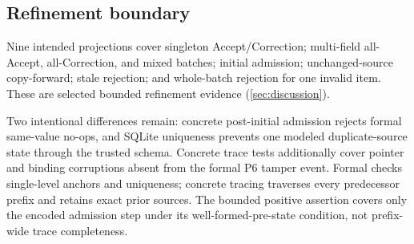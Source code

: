 \subsection{Refinement boundary}

Nine intended projections cover singleton Accept/Correction; multi-field all-Accept, all-Correction, and mixed batches; initial admission; unchanged-source copy-forward; stale rejection; and whole-batch rejection for one invalid item. These are selected bounded refinement evidence (\cref{sec:discussion}).

Two intentional differences remain: concrete post-initial admission rejects formal same-value no-ops, and SQLite uniqueness prevents one modeled duplicate-source state through the trusted schema. Concrete trace tests additionally cover pointer and binding corruptions absent from the formal P6 tamper event. Formal  checks single-level anchors and uniqueness; concrete tracing traverses every predecessor prefix and retains exact prior sources. The bounded positive assertion covers only the encoded admission step under its well-formed-pre-state condition, not prefix-wide trace completeness.